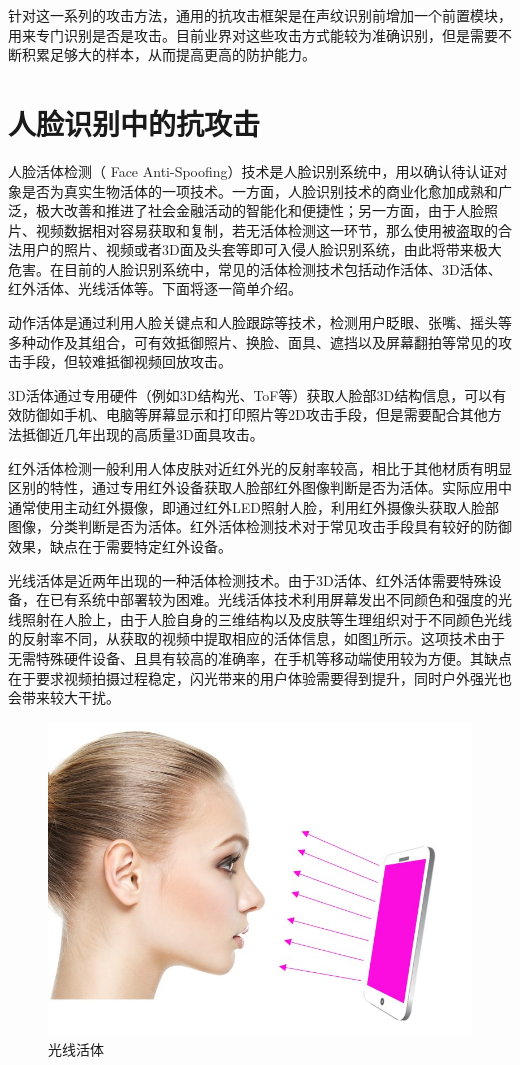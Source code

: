针对这一系列的攻击方法，通用的抗攻击框架是在声纹识别前增加一个前置模块，用来专门识别是否是攻击。目前业界对这些攻击方式能较为准确识别，但是需要不断积累足够大的样本，从而提高更高的防护能力。


\section{人脸识别中的抗攻击}

人脸活体检测（ Face Anti-Spoofing）技术是人脸识别系统中，用以确认待认证对象是否为真实生物活体的一项技术。一方面，人脸识别技术的商业化愈加成熟和广泛，极大改善和推进了社会金融活动的智能化和便捷性；另一方面，由于人脸照片、视频数据相对容易获取和复制，若无活体检测这一环节，那么使用被盗取的合法用户的照片、视频或者3D面及头套等即可入侵人脸识别系统，由此将带来极大危害\cite{chingovska2012effectiveness}。在目前的人脸识别系统中，常见的活体检测技术包括动作活体、3D活体、红外活体、光线活体等。下面将逐一简单介绍。

动作活体是通过利用人脸关键点和人脸跟踪等技术，检测用户眨眼、张嘴、摇头等多种动作及其组合，可有效抵御照片、换脸、面具、遮挡以及屏幕翻拍等常见的攻击手段，但较难抵御视频回放攻击。

3D活体通过专用硬件（例如3D结构光、ToF等）获取人脸部3D结构信息，可以有效防御如手机、电脑等屏幕显示和打印照片等2D攻击手段，但是需要配合其他方法抵御近几年出现的高质量3D面具攻击\cite{zhang2019dataset}。

红外活体检测一般利用人体皮肤对近红外光的反射率较高，相比于其他材质有明显区别的特性，通过专用红外设备获取人脸部红外图像判断是否为活体。实际应用中通常使用主动红外摄像，即通过红外LED照射人脸，利用红外摄像头获取人脸部图像，分类判断是否为活体。红外活体检测技术对于常见攻击手段具有较好的防御效果，缺点在于需要特定红外设备\cite{zhang2019dataset,yi2014face}。

光线活体是近两年出现的一种活体检测技术。由于3D活体、红外活体需要特殊设备，在已有系统中部署较为困难。光线活体技术利用屏幕发出不同颜色和强度的光线照射在人脸上，由于人脸自身的三维结构以及皮肤等生理组织对于不同颜色光线的反射率不同，从获取的视频中提取相应的活体信息，如图\ref{fig:light_reflection}所示。这项技术由于无需特殊硬件设备、且具有较高的准确率，在手机等移动端使用较为方便。其缺点在于要求视频拍摄过程稳定，闪光带来的用户体验需要得到提升，同时户外强光也会带来较大干扰\cite{liu2019aurora}。

\begin{figure}[ht]
\centering
\includegraphics[scale=0.5]{img/chapter_as/light_reflection.jpg}
\caption{光线活体}
\label{fig:light_reflection}
\end{figure}
